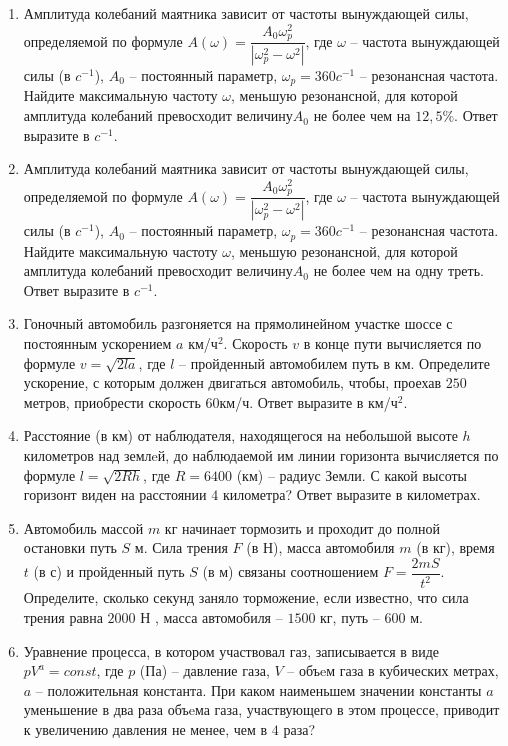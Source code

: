 \documentclass[12pt, a4paper]{article}
\begin{document}
\begin{enumerate}
		\item Амплитуда колебаний маятника зависит от частоты вынуждающей силы, определяемой по формуле \( A(\omega)=\dfrac{A_0\omega _p ^2}{|\omega _p ^2-\omega^2|} \), где \( \omega \) – частота вынуждающей силы (в \( c^{-1} \)), \( A_0 \) – постоянный параметр, \( \omega_p = 360c^{-1}\) – резонансная частота. Найдите максимальную частоту \( \omega  \), меньшую резонансной, для которой амплитуда колебаний превосходит величину\(  A_0  \) не более чем на \( 12,5\% \). Ответ выразите в \( c^{-1} \).
		\item Амплитуда колебаний маятника зависит от частоты вынуждающей силы, определяемой по формуле \( A(\omega)=\dfrac{A_0\omega _p ^2}{|\omega _p ^2-\omega^2|} \), где \( \omega \) – частота вынуждающей силы (в \( c^{-1} \)), \( A_0 \) – постоянный параметр, \( \omega_p = 360c^{-1}\) – резонансная частота. Найдите максимальную частоту \( \omega  \), меньшую резонансной, для которой амплитуда колебаний превосходит величину\(  A_0  \) не более чем на одну треть. Ответ выразите в \( c^{-1} \).
		\item Гоночный автомобиль разгоняется на прямолинейном участке шоссе с постоянным ускорением \( a \) км/ч\( ^2 \). Скорость \( v \)  в конце пути вычисляется по формуле \( v=\sqrt{2la} \), где \( l \) – пройденный автомобилем путь в км. Определите ускорение, с которым должен двигаться автомобиль, чтобы, проехав \( 250 \) метров, приобрести скорость \( 60 \)км/ч. Ответ выразите в км/ч\( ^2 \).
		\item Расстояние (в км) от наблюдателя, находящегося на небольшой высоте \( h \) километров над землeй, до наблюдаемой им линии горизонта вычисляется по формуле \( l=\sqrt{2Rh} \), где \( R = 6400 \) (км) – радиус Земли. С какой высоты горизонт виден на расстоянии \(4\) километра? Ответ выразите в километрах.
		\item Автомобиль массой \( m \) кг начинает тормозить и проходит до полной остановки путь \( S \) м. Сила трения \(  F \) (в \(  Н \)), масса автомобиля \( m \) (в кг), время \( t \) (в с) и пройденный путь \( S \) (в м) связаны соотношением \( F=\dfrac{2mS}{t^2} \). Определите, сколько секунд заняло торможение, если известно, что сила трения равна \( 2000\) Н , масса автомобиля – \( 1500 \) кг, путь – \( 600 \) м.
		\item Уравнение процесса, в котором участвовал газ, записывается в виде \( pV^a=const \), где \( p \) (Па) – давление газа, \( V \) – объeм газа в кубических метрах, \( a \) – положительная константа. При каком наименьшем значении константы \( a \) уменьшение в два раза объeма газа, участвующего в этом процессе, приводит к увеличению давления не менее, чем в \( 4 \) раза?

\end{enumerate}
\end{document}
